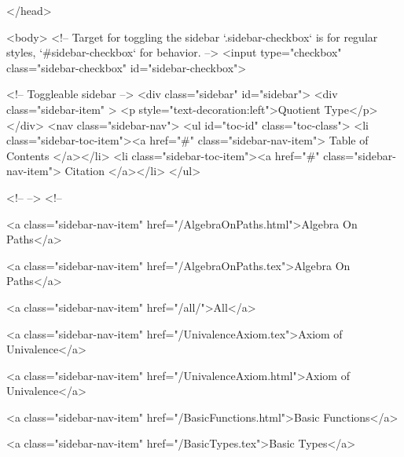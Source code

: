   
</head>




  <body>
    <!-- Target for toggling the sidebar `.sidebar-checkbox` is for regular
     styles, `#sidebar-checkbox` for behavior. -->
<input type="checkbox" class="sidebar-checkbox" id="sidebar-checkbox">

<!-- Toggleable sidebar -->
<div class="sidebar" id="sidebar">
  <div class="sidebar-item" >
    <p style="text-decoration:left">Quotient Type</p>
  </div>
  <nav class="sidebar-nav">
    <ul id="toc-id" class="toc-class">
  <li class="sidebar-toc-item"><a href="#" class="sidebar-nav-item"> Table of Contents </a></li>
  <li class="sidebar-toc-item"><a href="#" class="sidebar-nav-item"> Citation </a></li>
</ul>


    <!--  -->
    <!-- 
      
    
      
    
      
    
      
        
      
    
      
        
          <a class="sidebar-nav-item" href="/AlgebraOnPaths.html">Algebra On Paths</a>
        
      
    
      
        
          <a class="sidebar-nav-item" href="/AlgebraOnPaths.tex">Algebra On Paths</a>
        
      
    
      
        
          <a class="sidebar-nav-item" href="/all/">All</a>
        
      
    
      
        
          <a class="sidebar-nav-item" href="/UnivalenceAxiom.tex">Axiom of Univalence</a>
        
      
    
      
        
          <a class="sidebar-nav-item" href="/UnivalenceAxiom.html">Axiom of Univalence</a>
        
      
    
      
        
          <a class="sidebar-nav-item" href="/BasicFunctions.html">Basic Functions</a>
        
      
    
      
        
          <a class="sidebar-nav-item" href="/BasicTypes.tex">Basic Types</a>
        
